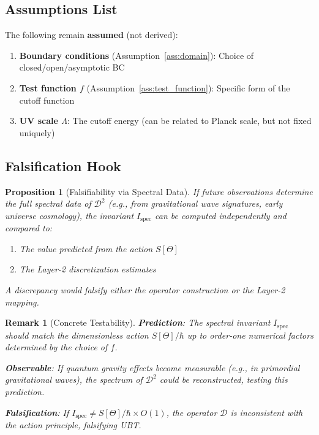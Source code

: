 \documentclass[12pt]{article}
\newtheorem{proposition}[definition]{Proposition}
\newtheorem{remark}[definition]{Remark}
\begin{document}
\subsection{Assumptions List}

The following remain \textbf{assumed} (not derived):
\begin{enumerate}
    \item \textbf{Boundary conditions} (Assumption~\ref{ass:domain}): Choice of closed/open/asymptotic BC
    \item \textbf{Test function $f$} (Assumption~\ref{ass:test_function}): Specific form of the cutoff function
    \item \textbf{UV scale $\Lambda$}: The cutoff energy (can be related to Planck scale, but not fixed uniquely)
\end{enumerate}

\subsection{Falsification Hook}

\begin{proposition}[Falsifiability via Spectral Data]
If future observations determine the full spectral data of $\mathcal{D}^2$ (e.g., from gravitational wave signatures, early universe cosmology), the invariant $I_{\text{spec}}$ can be computed independently and compared to:
\begin{enumerate}
    \item The value predicted from the action $S[\Theta]$
    \item The Layer-2 discretization estimates
\end{enumerate}
A discrepancy would falsify either the operator construction or the Layer-2 mapping.
\end{proposition}

\begin{remark}[Concrete Testability]
\textbf{Prediction}: The spectral invariant $I_{\text{spec}}$ should match the dimensionless action $S[\Theta]/\hbar$ up to order-one numerical factors determined by the choice of $f$.

\textbf{Observable}: If quantum gravity effects become measurable (e.g., in primordial gravitational waves), the spectrum of $\mathcal{D}^2$ could be reconstructed, testing this prediction.

\textbf{Falsification}: If $I_{\text{spec}} \neq S[\Theta]/\hbar \times O(1)$, the operator $\mathcal{D}$ is inconsistent with the action principle, falsifying UBT.
\end{remark}
\end{document}
